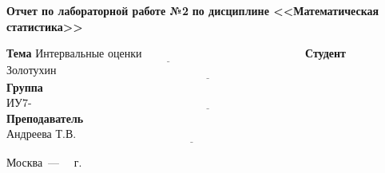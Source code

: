 \begin{titlepage}
	\begin{center}
		\noindent\begin{minipage}{1.1\textwidth}\centering
			\Large\textbf{  Отчет по лабораторной работе №2}\newline
			\textbf{по дисциплине <<Математическая статистика>>}\newline\newline
		\end{minipage}
	\end{center}
	
	\noindent\textbf{Тема} $\underline{\text{Интервальные оценки~~~~~~~~~~~~~~~~~~~~~~~~~~~~~~~~~~~~~~~~~~~}}$\newline\newline
	\noindent\textbf{Студент} $\underline{\text{Золотухин А.В.~~~~~~~~~~~~~~~~~~~~~~~~~~~~~~~~~~~~~~~~~~~~~~~~~~~~~~~~~~~~~~~~~~~~~~~~~~~~~~~~~~~~~~~~~}}$\newline\newline
	\noindent\textbf{Группа} $\underline{\text{ИУ7-64Б~~~~~~~~~~~~~~~~~~~~~~~~~~~~~~~~~~~~~~~~~~~~~~~~~~~~~~~~~~~~~~~~~~~~~~~~~~~~~~~~~~~~~~~~~~~~~~~~~~~~~}}$\newline\newline
	\noindent\textbf{Преподаватель} $\underline{\text{Андреева  Т.В.~~~~~~~~~~~~~~~~~~~~~~~~~~~~~~~~~~~~~~~~~~~~~~~~~~~~~~~~~~~~~~~~~~~~~~~~~~~~~~~~~}}$\newline\newline\newline
	
\begin{center}
	\vfill
	Москва~---~\the\year
	~г.
\end{center}

\end{titlepage}